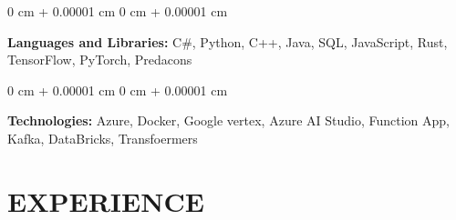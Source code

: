 \documentclass[10pt, letterpaper]{article}
\newenvironment{onecolentry}{
    \begin{adjustwidth}{
        0 cm + 0.00001 cm
    }{
        0 cm + 0.00001 cm
    }
}{
    \end{adjustwidth}
} %
\begin{document}
        
        \begin{onecolentry}
            \textbf{Languages and Libraries:} C\#, Python, C++, Java, SQL, JavaScript, Rust, TensorFlow, PyTorch, Predacons
        \end{onecolentry}

        \vspace{0.1 cm}

        \begin{onecolentry}
            \textbf{Technologies:} Azure, Docker, Google vertex, Azure AI Studio, Function App, Kafka, DataBricks, Transfoermers\end{onecolentry}

        

    \section{EXPERIENCE}
\end{document}
